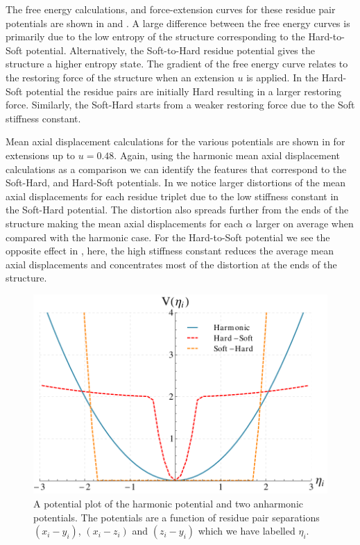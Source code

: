 The free energy calculations, and force-extension curves for these residue pair potentials are shown in  and . A large difference between the free energy curves is primarily due to the low entropy of the structure corresponding to the Hard-to-Soft potential. Alternatively, the Soft-to-Hard residue potential gives the structure a higher entropy state. The gradient of the free energy curve relates to the restoring force of the structure when an extension $u$ is applied. In the Hard-Soft potential the residue pairs are initially Hard resulting in a larger restoring force. Similarly, the Soft-Hard starts from a weaker restoring force due to the Soft stiffness constant.  

Mean axial displacement calculations for the various potentials are shown in  for extensions up to $u=0.48$. Again, using the harmonic mean axial displacement calculations as a comparison we can identify the features that correspond to the Soft-Hard, and Hard-Soft potentials. In  we notice larger distortions of the mean axial displacements for each residue triplet due to the low stiffness constant in the Soft-Hard potential. The distortion also spreads further from the ends of the structure making the mean axial displacements for each $\alpha$  larger on average when compared with the harmonic case. For the Hard-to-Soft potential we see the opposite effect in , here, the high stiffness constant reduces the average mean axial displacements and concentrates most of the distortion at the ends of the structure.

\newpage
\begin{figure}[H]
\centering \includegraphics[scale=0.55]{Results/Collagen/various_potentials/col_pe_N5_L6_m24_kappa1_sigma1.pdf}
\caption{A potential plot of the harmonic potential and two anharmonic potentials. The potentials are a function of residue pair separations $(x_{i}-y_{i})$, $(x_{i}-z_{i})$ and $(z_{i}-y_{i})$ which we have labelled $\eta_{i}$.  }
\label{fig:collagen_pe}
\end{figure}

